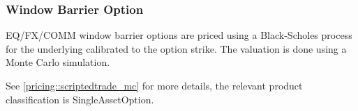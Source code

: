 \subsubsection{Window Barrier Option}
\label{pricing:window_barrieroption}

EQ/FX/COMM window barrier options are priced using a Black-Scholes process for the underlying calibrated to the option
strike. The valuation is done using a Monte Carlo simulation.

See \ref{pricing::scriptedtrade_mc} for more details, the relevant product classification is SingleAssetOption.
